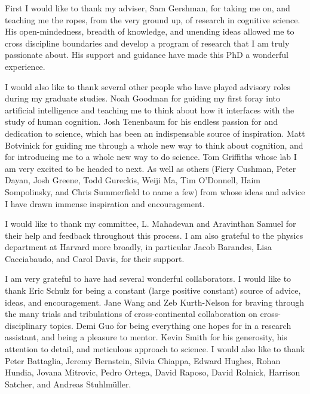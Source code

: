 

First I would like to thank my adviser, Sam Gershman, for taking me on, and teaching me the ropes, from the very ground up, of research in cognitive science. His open-mindedness, breadth of knowledge, and unending ideas allowed me to cross discipline boundaries and develop a program of research that I am truly passionate about. His support and guidance have made this PhD a wonderful experience.

I would also like to thank several other people who have played advisory roles during my graduate studies. Noah Goodman for guiding my first foray into artificial intelligence and teaching me to think about how it interfaces with the study of human cognition. Josh Tenenbaum for his endless passion for and dedication to science, which has been an indispensable source of inspiration. Matt Botvinick for guiding me through a whole new way to think about cognition, and for introducing me to a whole new way to do science. Tom Griffiths whose lab I am very excited to be headed to next. As well as others (Fiery Cushman, Peter Dayan, Josh Greene, Todd Gureckis, Weiji Ma, Tim O'Donnell, Haim Sompolinsky, and Chris Summerfield to name a few) from whose ideas and advice I have drawn immense inspiration and encouragement.

I would like to thank my committee, L. Mahadevan and Aravinthan Samuel for their help and feedback throughout this process. I am also grateful to the physics department at Harvard more broadly, in particular Jacob Barandes, Lisa Cacciabaudo, and Carol Davis, for their support.

I am very grateful to have had several wonderful collaborators. I would like to thank Eric Schulz for being a constant (large positive constant) source of advice, ideas, and encouragement. Jane Wang and Zeb Kurth-Nelson for braving through the many trials and tribulations of cross-continental collaboration on cross-disciplinary topics. Demi Guo for being everything one hopes for in a research assistant, and being a pleasure to mentor. Kevin Smith for his generosity, his attention to detail, and meticulous approach to science. I would also like to thank Peter Battaglia, Jeremy Bernstein, Silvia Chiappa, Edward Hughes, Rohan Hundia,  Jovana Mitrovic, Pedro Ortega, David Raposo, David Rolnick, Harrison Satcher, and Andreas Stuhlmüller.

